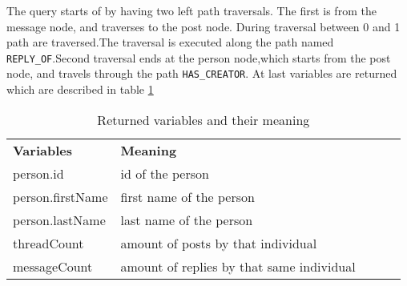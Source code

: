 

The query starts of by having two  left path traversals. The first is from the message node,
and traverses to the post node. During traversal between 0 and 1 path are traversed.The traversal is executed
along the path named \texttt{REPLY\_OF}.Second traversal ends at the person node,which starts from the  post node, and travels 
through the path \texttt{HAS\_CREATOR}. At last variables are returned which are described in table \ref{RetCypher9BITable} 

\begin{table}[!ht]
\begin{tabular}{|l|l|lll}
\cline{1-2}
\textbf{Variables} & \textbf{Meaning}                          &  &  &  \\ \cline{1-2}
person.id          & id of the person                          &  &  &  \\ \cline{1-2}
person.firstName   & first name of the person                  &  &  &  \\ \cline{1-2}
person.lastName    & last name of the person                   &  &  &  \\ \cline{1-2}
threadCount        & amount of posts by that individual        &  &  &  \\ \cline{1-2}
messageCount       & amount of replies by that same individual &  &  &  \\ \cline{1-2}
\end{tabular}
\caption{Returned variables and their meaning}
\label{RetCypher9BITable}
\end{table}
